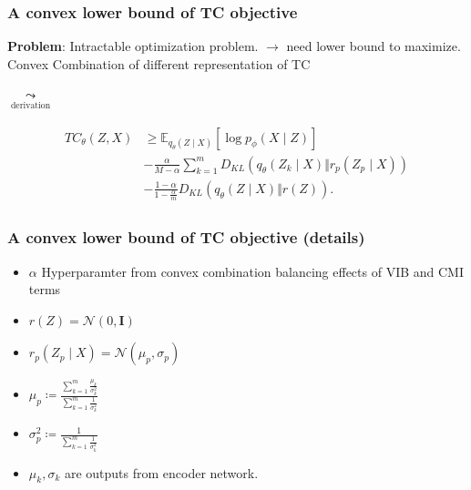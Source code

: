 \documentclass{beamer}
\newcommand{\E}{\mathbb{E}}
\theoremstyle{definition}
\begin{document}
    \begin{frame}
      \frametitle{A convex lower bound of TC objective}
      \textbf{Problem}: Intractable optimization problem.
\newline
      \vspace{.5 cm}
      $\to$ need lower bound to maximize.
      \newline
      Convex Combination of different representation of TC
      \begin{center}
        $\underset{\text{derivation}}{\leadsto}$
      \end{center}
      \begin{align*}
        \begin{split}
          TC_{\theta}(Z, X) &\geq \E_{q_{\theta}(Z \mid X)}[\log p_{\phi}(X \mid Z)]\\
          &- \frac{\alpha}{M-\alpha} \sum_{k=1}^{m}D_{KL}(q_{\theta}(Z_{k} \mid X) \Vert r_{p}(Z_{p} \mid X))\\
          &- \frac{1-\alpha}{1 - \frac{\alpha}{m}}D_{KL}(q_{\theta}(Z \mid X) \Vert r(Z)).
        \end{split}
      \end{align*}
    \end{frame}
    \begin{frame}
      \frametitle{A convex lower bound of TC objective (details)}
      \begin{itemize}
              \item $\alpha$ Hyperparamter from convex combination balancing effects of VIB and CMI terms
        \item $r(Z) = \mathcal{N}(0, \mathbf{I})$
        \item $r_{p}(Z_{p} \mid X) = \mathcal{N}(\mu_{p}, \sigma_{p})$
        \item $\mu_{p} \coloneqq \frac{\sum_{k=1}^{m}\frac{\mu_{k}}{\sigma_{k}^{2}}}{\sum_{k=1}^{m}\frac{1}{\sigma_{k}^{2}}}$
        \item $\sigma_{p}^{2} \coloneqq \frac{1}{\sum_{k=1}^{m}\frac{1}{\sigma_{k}^{2}}}$
              \item $\mu_{k}, \sigma_{k}$ are outputs from encoder network.
      \end{itemize}
    \end{frame}
\end{document}
